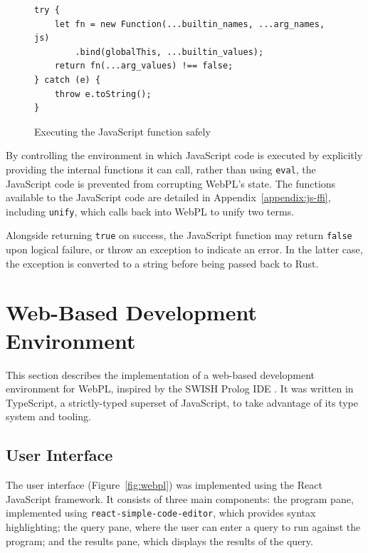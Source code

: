 \begin{figure}[H]
\centering
\begin{verbatim}
try {
    let fn = new Function(...builtin_names, ...arg_names, js)
        .bind(globalThis, ...builtin_values);
    return fn(...arg_values) !== false;
} catch (e) {
    throw e.toString();
}
\end{verbatim}
\caption{Executing the JavaScript function safely}
\label{fig:js-execution}
\end{figure}

By controlling the environment in which JavaScript code is executed by explicitly providing the internal functions it can call, rather than using \texttt{eval}, the JavaScript code is prevented from corrupting WebPL's state. The functions available to the JavaScript code are detailed in Appendix~\ref{appendix:js-ffi}, including \texttt{unify}, which calls back into WebPL to unify two terms.

Alongside returning \texttt{true} on success, the JavaScript function may return \texttt{false} upon logical failure, or throw an exception to indicate an error. In the latter case, the exception is converted to a string before being passed back to Rust.

\section{Web-Based Development Environment}

\label{sec:web-dev-env}

This section describes the implementation of a web-based development environment for WebPL, inspired by the SWISH Prolog IDE \cite{wielemakerSWISHSWIPrologSharing2015}. It was written in TypeScript, a strictly-typed superset of JavaScript, to take advantage of its type system and tooling.

\subsection{User Interface}

The user interface (Figure~\ref{fig:webpl}) was implemented using the React JavaScript framework. It consists of three main components: the program pane, implemented using \texttt{react-simple-code-editor}, which provides syntax highlighting; the query pane, where the user can enter a query to run against the program; and the results pane, which displays the results of the query.

